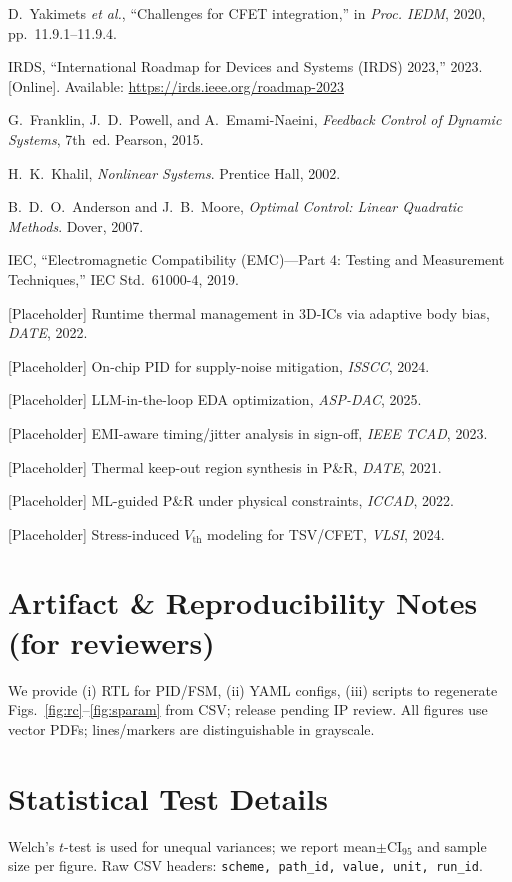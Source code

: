 \documentclass[conference]{IEEEtran}
\newcommand{\etal}{\textit{et al.}}
\newcommand{\CI}{\mathrm{CI}_{95}}
\begin{document}
\begin{thebibliography}{99}

D.~Yakimets \etal, ``Challenges for CFET integration,'' in \emph{Proc. IEDM}, 2020, pp.~11.9.1--11.9.4.

IRDS, ``International Roadmap for Devices and Systems (IRDS) 2023,'' 2023. [Online]. Available: \url{https://irds.ieee.org/roadmap-2023}

G.~Franklin, J.~D.~Powell, and A.~Emami-Naeini, \emph{Feedback Control of Dynamic Systems}, 7th~ed. Pearson, 2015.

H.~K.~Khalil, \emph{Nonlinear Systems}. Prentice Hall, 2002.

B.~D.~O.~Anderson and J.~B.~Moore, \emph{Optimal Control: Linear Quadratic Methods}. Dover, 2007.

IEC, ``Electromagnetic Compatibility (EMC)---Part 4: Testing and Measurement Techniques,'' IEC Std.~61000-4, 2019.

[Placeholder] Runtime thermal management in 3D-ICs via adaptive body bias, \emph{DATE}, 2022.

[Placeholder] On-chip PID for supply-noise mitigation, \emph{ISSCC}, 2024.

[Placeholder] LLM-in-the-loop EDA optimization, \emph{ASP-DAC}, 2025.

[Placeholder] EMI-aware timing/jitter analysis in sign-off, \emph{IEEE TCAD}, 2023.

[Placeholder] Thermal keep-out region synthesis in P\&R, \emph{DATE}, 2021.

[Placeholder] ML-guided P\&R under physical constraints, \emph{ICCAD}, 2022.

[Placeholder] Stress-induced $V_{\mathrm{th}}$ modeling for TSV/CFET, \emph{VLSI}, 2024.

\end{thebibliography}

\appendices
\section{Artifact \& Reproducibility Notes (for reviewers)}
We provide (i) RTL for PID/FSM, (ii) YAML configs, (iii) scripts to regenerate Figs.~\ref{fig:rc}--\ref{fig:sparam} from CSV; release pending IP review. All figures use vector PDFs; lines/markers are distinguishable in grayscale.

\section{Statistical Test Details}
Welch's $t$-test is used for unequal variances; we report mean$\pm\CI$ and sample size per figure. Raw CSV headers: \texttt{scheme, path\_id, value, unit, run\_id}.
\end{document}
